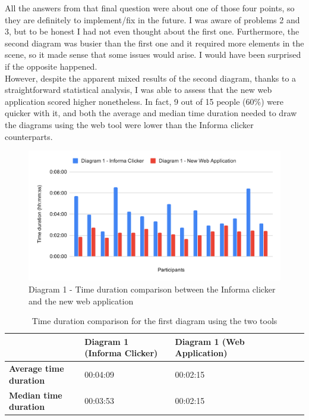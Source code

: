 \documentclass[]{usiinfbachelorproject}
\begin{document}
\noindent All the answers from that final question were about one of those four points, so they are definitely to implement/fix in the future. I was aware of problems 2 and 3, but to be honest I had not even thought about the first one. Furthermore, the second diagram was busier than the first one and it required more elements in the scene, so it made sense that some issues would arise. I would have been surprised if the opposite happened.\\
However, despite the apparent mixed results of the second diagram, thanks to a straightforward statistical analysis, I was able to assess that the new web application scored higher nonetheless. In fact, 9 out of 15 people (60\%) were quicker with it, and both the average and median time duration needed to draw the diagrams using the web tool were lower than the Informa clicker counterparts. 

\begin{figure}[h!]
\centering
\includegraphics[scale=0.6]{figures/diagram1-time-comparison.png}
\caption {Diagram 1 - Time duration comparison between the Informa clicker and the new web application}
\end{figure}

\begin{table}[h!]
\centering
\begin{tabular}{|l|l|l|l|l|l|l|}
\hline
 & \textbf{Diagram 1 (Informa Clicker)} & \textbf{Diagram 1 (Web Application)} \\ \hline
\textbf{Average time duration} & 00:04:09 & 00:02:15 \\ \hline
\textbf{Median time duration} & 00:03:53 & 00:02:15 \\ \hline
\end{tabular}
\caption{Time duration comparison for the first diagram using the two tools}
\end{table}
\end{document}
